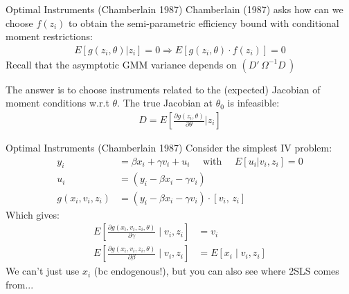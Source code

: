 \documentclass[xcolor=pdftex,dvipsnames,table,mathserif,aspectratio=169]{beamer}
\begin{document}
\begin{frame}{Optimal Instruments (Chamberlain 1987)}
Chamberlain (1987) asks how can we choose $f(z_i)$ to obtain the semi-parametric efficiency bound with conditional moment restrictions:
\begin{align*}
E[g(z_i,\theta) | z_i]=0 \Rightarrow E[g(z_i,\theta) \cdot f(z_i) ]=0 
\end{align*}
Recall that the asymptotic GMM variance depends on $(D'\, \Omega^{-1} D\,)$

The answer is to choose instruments related to the (expected) Jacobian of moment conditions w.r.t $\theta$. The true Jacobian at $\theta_0$ is \alert{infeasible}:
\begin{align*}
D=E\left[\frac{\partial g(z_i,\theta)}{\partial \theta} | z_i \right]
\end{align*}
\end{frame}


\begin{frame}{Optimal Instruments (Chamberlain 1987)}
Consider the simplest IV problem:
\begin{align*}
y_i &= \beta x_i + \gamma v_i + u_i \quad \text{ with } \quad E[u_i | v_i, z_i] =0 \\
u_i &= \left(y_i - \beta x_i - \gamma v_i \right) \\
g(x_i,v_i,z_i) &= \left(y_i - \beta x_i - \gamma v_i \right) \cdot [v_i,\, z_i]
 \end{align*}
 Which gives:
\begin{align*}
E\left[\frac{\partial g(x_i,v_i, z_i,\theta)}{\partial \gamma} \mid v_i, z_i \right] &= v_i\\
E\left[\frac{\partial g(x_i,v_i, z_i,\theta)}{\partial \beta} \mid v_i, z_i \right] &=E\left[x_i \mid v_i, z_i \right]
\end{align*}
We can't just use $x_i$ (bc endogenous!), but you can also see where 2SLS comes from...
\end{frame}
\end{document}
